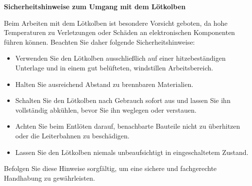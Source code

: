 \textbf{Sicherheitshinweise zum Umgang mit dem Lötkolben}

Beim Arbeiten mit dem Lötkolben ist besondere Vorsicht geboten, da hohe Temperaturen zu Verletzungen oder Schäden an elektronischen Komponenten führen können. Beachten Sie daher folgende Sicherheitshinweise:

\begin{itemize}
	\item Verwenden Sie den Lötkolben ausschließlich auf einer hitzebeständigen Unterlage und in einem gut belüfteten, windstillen Arbeitsbereich.
	\item Halten Sie ausreichend Abstand zu brennbaren Materialien.
	\item Schalten Sie den Lötkolben nach Gebrauch sofort aus und lassen Sie ihn vollständig abkühlen, bevor Sie ihn weglegen oder verstauen.
	\item Achten Sie beim Entlöten darauf, benachbarte Bauteile nicht zu überhitzen oder die Leiterbahnen zu beschädigen.
	\item Lassen Sie den Lötkolben niemals unbeaufsichtigt in eingeschaltetem Zustand.
\end{itemize}

Befolgen Sie diese Hinweise sorgfältig, um eine sichere und fachgerechte Handhabung zu gewährleisten.

